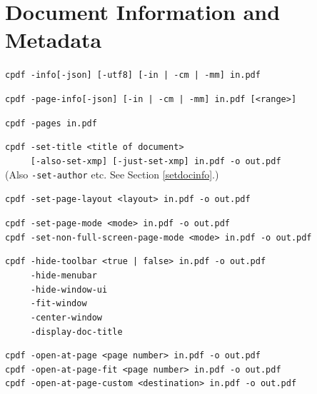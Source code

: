 \documentclass{book}
\begin{document}
\chapter{Document Information and Metadata}\label{chap:11}
\pagestyle{fancy}
  \begin{framed}

    \small\noindent\verb!cpdf -info[-json] [-utf8] [-in | -cm | -mm] in.pdf!

    \vspace{1.5mm}
    \small\noindent\verb!cpdf -page-info[-json] [-in | -cm | -mm] in.pdf [<range>]!

    \vspace{1.5mm}
    \small\noindent\verb!cpdf -pages in.pdf!

    \vspace{1.5mm}
    \small\noindent\verb!cpdf -set-title <title of document>!\\
    \small\noindent\verb!     [-also-set-xmp] [-just-set-xmp] in.pdf -o out.pdf!\\
    (Also \texttt{-set-author} etc. See Section \ref{setdocinfo}.)

    \vspace{1.5mm}
    \small\noindent\verb!cpdf -set-page-layout <layout> in.pdf -o out.pdf!

    \vspace{1.5mm}
    \small\noindent\verb!cpdf -set-page-mode <mode> in.pdf -o out.pdf!\\
    \small\noindent\verb!cpdf -set-non-full-screen-page-mode <mode> in.pdf -o out.pdf!



    \vspace{1.5mm} 
    \small\noindent\verb!cpdf -hide-toolbar <true | false> in.pdf -o out.pdf!\\
    \noindent\verb!     -hide-menubar!\\
    \noindent\verb!     -hide-window-ui!\\
    \noindent\verb!     -fit-window!\\
    \noindent\verb!     -center-window!\\
    \noindent\verb!     -display-doc-title!
    
    \vspace{1.5mm}
    \small\noindent\verb!cpdf -open-at-page <page number> in.pdf -o out.pdf!\\
    \noindent\verb!cpdf -open-at-page-fit <page number> in.pdf -o out.pdf!\\
    \noindent\verb!cpdf -open-at-page-custom <destination> in.pdf -o out.pdf!


\end{framed}
\end{document}

